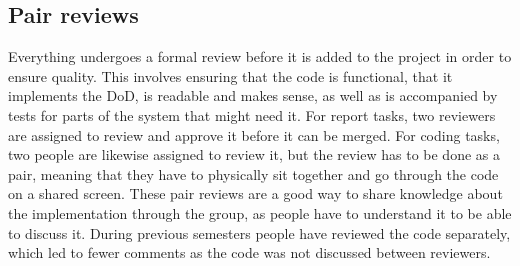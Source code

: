 \subsection{Pair reviews}
Everything undergoes a formal review before it is added to the project in order to ensure quality.
This involves ensuring that the code is functional, that it implements the DoD, is readable and makes sense, as well as is accompanied by tests for parts of the system that might need it.
For report tasks, two reviewers are assigned to review and approve it before it can be merged.
For coding tasks, two people are likewise assigned to review it, but the review has to be done as a pair, meaning that they have to physically sit together and go through the code on a shared screen.
These pair reviews are a good way to share knowledge about the implementation through the group, as people have to understand it to be able to discuss it.
During previous semesters people have reviewed the code separately, which led to fewer comments as the code was not discussed between reviewers.